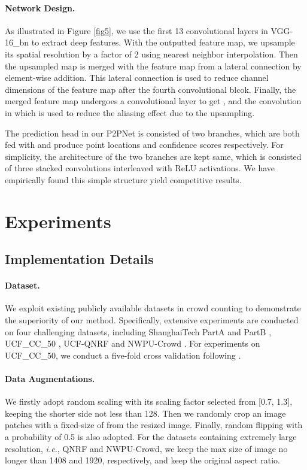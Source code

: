 \documentclass[10pt,twocolumn,letterpaper]{article}
\begin{document}
\paragraph{Network Design.} As illustrated in Figure \ref{fig5}, we use the first 13 convolutional layers in VGG-16\_bn \cite{simonyan2014very} to extract deep features. With the outputted feature map, we upsample its spatial resolution by a factor of 2 using nearest neighbor interpolation. Then the upsampled map is merged with the feature map from a lateral connection by element-wise addition. This lateral connection is used to reduce channel dimensions of the feature map after the fourth convolutional blcok. Finally, the merged feature map undergoes a  convolutional layer to get , and the convolution in which is used to reduce the aliasing effect due to the upsampling.

The prediction head in our P2PNet is consisted of two branches, which are both fed with  and produce point locations and confidence scores respectively. For simplicity, the architecture of the two branches are kept same, which is consisted of three stacked convolutions interleaved with ReLU activations. We have empirically found this simple structure yield competitive results.
\section{Experiments}
\subsection{Implementation Details}
\paragraph{Dataset.} We exploit existing publicly available datasets in crowd counting to demonstrate the superiority of our method. Specifically, extensive experiments are conducted on four challenging datasets, including ShanghaiTech PartA and PartB \cite{zhang2016single}, UCF\_CC\_50 \cite{idrees2013multi}, UCF-QNRF \cite{idrees2018composition} and NWPU-Crowd \cite{wang2020nwpu}. For experiments on UCF\_CC\_50, we conduct a five-fold cross validation following \cite{idrees2013multi}.

\vspace{-1.0em}
\paragraph{Data Augmentations.} We firstly adopt random scaling with its scaling factor selected from [0.7, 1.3], keeping the shorter side not less than 128. Then we randomly crop an image patches with a fixed-size of  from the resized image. Finally, random flipping with a probability of 0.5 is also adopted. For the datasets containing extremely large resolution, \textit{i.e.}, QNRF and NWPU-Crowd, we keep the max size of image no longer than 1408 and 1920, respectively, and keep the original aspect ratio.
\vspace{-1.0em}
\end{document}
